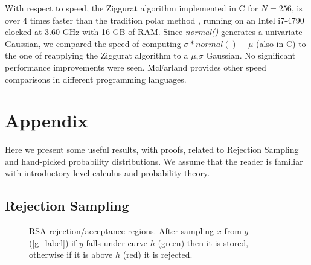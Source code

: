 \documentclass[11pt,onecolumn]{article}
\let\oldref\ref%
\def\ref{\oldref*}}
\begin{document}
With respect to speed, the Ziggurat algorithm implemented in C for $N=256$, is over 4 times faster than the tradition polar method \cite{marsaglia}, running on an Intel i7-4790 clocked at 3.60 GHz with 16 GB of RAM. Since \textit{normal()} generates a univariate Gaussian, we compared the speed of computing $\sigma*normal()+\mu$ (also in C) to the one of reapplying the Ziggurat algorithm to a $\mu$,$\sigma$ Gaussian. No significant performance improvements were seen. McFarland \cite{mcfarland} provides other speed comparisons in different programming languages.

\section{Appendix}
Here we present some useful results, with proofs, related to Rejection Sampling and hand-picked probability distributions. We assume that the reader is familiar with introductory level calculus and probability theory.

\subsection{Rejection Sampling}\label{rsampling}
 	
\begin{figure}[h]
\centering
{}
	\caption{RSA rejection/acceptance regions. After sampling $x$ from $g$ (\ref{g_label}) if $y$ falls under curve $h$ (green) then it is stored, otherwise if it is above $h$ (red) it is rejected.}
	\label{fig:RSA}
\end{figure}
\end{document}
